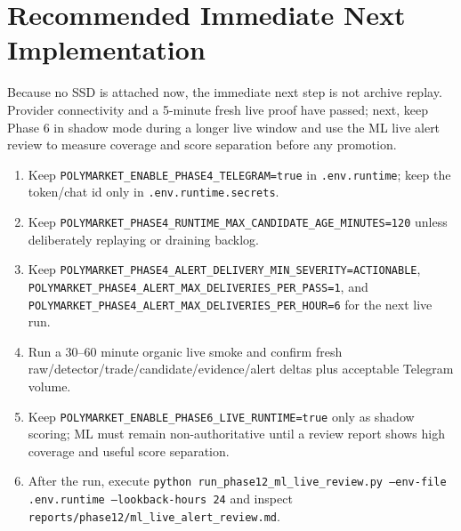 \documentclass{article}
\begin{document}
\section*{Recommended Immediate Next Implementation}
Because no SSD is attached now, the immediate next step is not archive replay. Provider connectivity and a 5-minute fresh live proof have passed; next, keep Phase 6 in shadow mode during a longer live window and use the ML live alert review to measure coverage and score separation before any promotion.
\begin{enumerate}[nosep]
\item Keep \texttt{POLYMARKET\_ENABLE\_PHASE4\_TELEGRAM=true} in \texttt{.env.runtime}; keep the token/chat id only in \texttt{.env.runtime.secrets}.
\item Keep \texttt{POLYMARKET\_PHASE4\_RUNTIME\_MAX\_CANDIDATE\_AGE\_MINUTES=120} unless deliberately replaying or draining backlog.
\item Keep \texttt{POLYMARKET\_PHASE4\_ALERT\_DELIVERY\_MIN\_SEVERITY=ACTIONABLE}, \texttt{POLYMARKET\_PHASE4\_ALERT\_MAX\_DELIVERIES\_PER\_PASS=1}, and \texttt{POLYMARKET\_PHASE4\_ALERT\_MAX\_DELIVERIES\_PER\_HOUR=6} for the next live run.
\item Run a 30--60 minute organic live smoke and confirm fresh raw/detector/trade/candidate/evidence/alert deltas plus acceptable Telegram volume.
\item Keep \texttt{POLYMARKET\_ENABLE\_PHASE6\_LIVE\_RUNTIME=true} only as shadow scoring; ML must remain non-authoritative until a review report shows high coverage and useful score separation.
\item After the run, execute \texttt{python run\_phase12\_ml\_live\_review.py --env-file .env.runtime --lookback-hours 24} and inspect \texttt{reports/phase12/ml\_live\_alert\_review.md}.
\end{enumerate}
\end{document}
